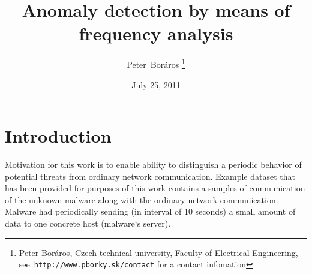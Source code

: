 \documentclass[a4paper,journal]{IEEEtran}
\begin{document}
\title{Anomaly detection by means of frequency analysis}
\date{July 25, 2011}
\author{Peter~Boráros %
\thanks{{Peter Boráros}, Czech technical university, Faculty of Electrical Engineering,
see~\texttt{http://www.pborky.sk/contact} for a contact infomation}}%



\maketitle
\IEEEdisplaynotcompsoctitleabstractindextext
\IEEEpeerreviewmaketitle


\section{Introduction}
Motivation for this work is to enable ability to distinguish a periodic behavior of potential threats from ordinary network communication. Example dataset that has been provided for purposes of this work contains a samples of communication of the unknown malware along with the ordinary network communication. Malware had periodically sending  (in interval of 10 seconds) a small amount of data to one concrete host (malware`s server).
\end{document}
